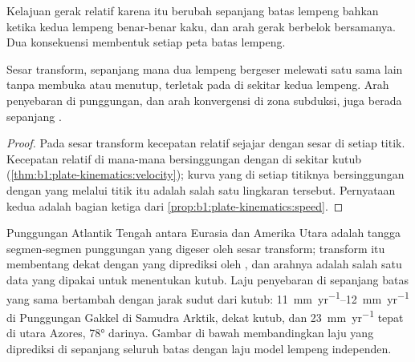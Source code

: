 Kelajuan gerak relatif karena itu berubah sepanjang batas lempeng bahkan ketika kedua lempeng benar-benar kaku, dan arah gerak berbelok bersamanya. Dua konsekuensi membentuk setiap peta batas lempeng.

\begin{proposition}\label{prop:b1:plate-kinematics:transforms}
Sesar transform, sepanjang mana dua lempeng bergeser melewati satu sama lain tanpa membuka atau menutup, terletak pada  di sekitar  kedua lempeng. Arah penyebaran di punggungan, dan arah konvergensi di zona subduksi, juga berada sepanjang .
\end{proposition}

\begin{proof}
Pada sesar transform kecepatan relatif sejajar dengan sesar di setiap titik. Kecepatan relatif di mana-mana bersinggungan dengan  di sekitar kutub (\cref{thm:b1:plate-kinematics:velocity}); kurva yang di setiap titiknya bersinggungan dengan  yang melalui titik itu adalah salah satu lingkaran tersebut. Pernyataan kedua adalah bagian ketiga dari \cref{prop:b1:plate-kinematics:speed}.
\end{proof}

Punggungan Atlantik Tengah antara Eurasia dan Amerika Utara adalah tangga segmen-segmen punggungan yang digeser oleh sesar transform; transform itu membentang dekat dengan  yang diprediksi oleh , dan arahnya adalah salah satu data yang dipakai untuk menentukan kutub. Laju penyebaran di sepanjang batas yang sama bertambah dengan jarak sudut dari kutub: \qtyrange{11}{12}{mm.yr^{-1}} di Punggungan Gakkel di Samudra Arktik, dekat kutub, dan \qty{23}{mm.yr^{-1}} tepat di utara Azores, \ang{78} darinya. Gambar di bawah membandingkan laju yang diprediksi  di sepanjang seluruh batas dengan laju model lempeng independen.

